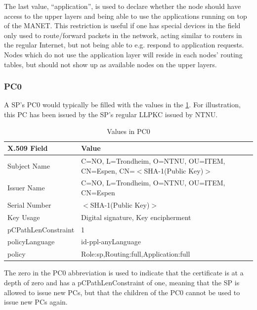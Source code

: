 The last value, ``application'', is used to declare whether the node should have
access to the upper layers and being able to use the applications running on top
of the \ac{MANET}. This restriction is useful if one has special devices in the
field only used to route/forward packets in the network, acting similar to
routers in the regular Internet, but not being able to e.g. respond to
application requests. Nodes which do not use the application layer will reside
in each nodes' routing tables, but should not show up as available nodes on the
upper layers.

\subsubsection*{\acf{PC0}}
A \acl{SP}'s \ac{PC0} would typically be filled with the values in the
\ref{tab:pc0_values}. For illustration, this \ac{PC} has been issued by the
\ac{SP}'s regular \ac{LLPKC} issued by NTNU.
\begin{table}[h]
	\begin{tabularx}{\linewidth}{ | l | X |}
		\hline
 		\textbf{X.509 Field} & \textbf{Value}\\\hline
		Subject Name & C=NO, L=Trondheim, O=NTNU, OU=ITEM, CN=Espen, CN=$<$SHA-1(Public Key)$>$ \\\hline
		Issuer Name & C=NO, L=Trondheim, O=NTNU, OU=ITEM, CN=Espen \\\hline 
		Serial Number & $<$SHA-1(Public Key)$>$ \\\hline 
		Key Usage & Digital signature, Key encipherment \\\hline 
		pCPathLenConstraint & 1 \\\hline 
		policyLanguage & id-ppl-anyLanguage \\\hline 
		policy & Role:sp,Routing:full,Application:full \\\hline 
	\end{tabularx}
	\caption{Values in \acf{PC0}}
	\label{tab:pc0_values}
\end{table}
The zero in the PC0 abbreviation is used to indicate that the certificate is at
a depth of zero and has a pCPathLenConstraint of one, meaning that the \ac{SP}
is allowed to issue new \acp{PC}, but that the children of the \ac{PC0} cannot
be used to issue new \acp{PC} again.

